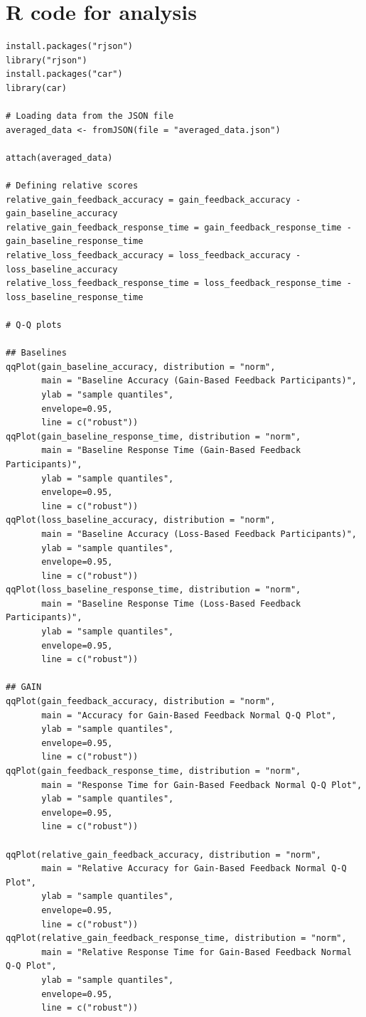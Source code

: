 \documentclass[12pt]{exam}
\begin{document}
\section{R code for analysis}
\begin{verbatim}
install.packages("rjson")
library("rjson")
install.packages("car")
library(car)

# Loading data from the JSON file
averaged_data <- fromJSON(file = "averaged_data.json")

attach(averaged_data)

# Defining relative scores
relative_gain_feedback_accuracy = gain_feedback_accuracy - gain_baseline_accuracy
relative_gain_feedback_response_time = gain_feedback_response_time - gain_baseline_response_time
relative_loss_feedback_accuracy = loss_feedback_accuracy - loss_baseline_accuracy
relative_loss_feedback_response_time = loss_feedback_response_time - loss_baseline_response_time

# Q-Q plots

## Baselines
qqPlot(gain_baseline_accuracy, distribution = "norm", 
       main = "Baseline Accuracy (Gain-Based Feedback Participants)",
       ylab = "sample quantiles",
       envelope=0.95,
       line = c("robust"))
qqPlot(gain_baseline_response_time, distribution = "norm", 
       main = "Baseline Response Time (Gain-Based Feedback Participants)",
       ylab = "sample quantiles",
       envelope=0.95,
       line = c("robust"))
qqPlot(loss_baseline_accuracy, distribution = "norm", 
       main = "Baseline Accuracy (Loss-Based Feedback Participants)",
       ylab = "sample quantiles",
       envelope=0.95,
       line = c("robust"))
qqPlot(loss_baseline_response_time, distribution = "norm", 
       main = "Baseline Response Time (Loss-Based Feedback Participants)",
       ylab = "sample quantiles",
       envelope=0.95,
       line = c("robust"))

## GAIN
qqPlot(gain_feedback_accuracy, distribution = "norm", 
       main = "Accuracy for Gain-Based Feedback Normal Q-Q Plot",
       ylab = "sample quantiles",
       envelope=0.95,
       line = c("robust"))
qqPlot(gain_feedback_response_time, distribution = "norm", 
       main = "Response Time for Gain-Based Feedback Normal Q-Q Plot",
       ylab = "sample quantiles",
       envelope=0.95,
       line = c("robust"))

qqPlot(relative_gain_feedback_accuracy, distribution = "norm", 
       main = "Relative Accuracy for Gain-Based Feedback Normal Q-Q Plot",
       ylab = "sample quantiles",
       envelope=0.95,
       line = c("robust"))
qqPlot(relative_gain_feedback_response_time, distribution = "norm", 
       main = "Relative Response Time for Gain-Based Feedback Normal Q-Q Plot",
       ylab = "sample quantiles",
       envelope=0.95,
       line = c("robust"))


\end{verbatim}
\end{document}
